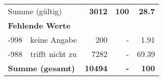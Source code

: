 \begin{longtable}{lXrrr}
     \midrule
     \multicolumn{2}{l}{Summe (gültig)} &
       \textbf{\num{3012}} &
     \textbf{100} &
       \textbf{\num[round-mode=places,round-precision=2]{28,7}} \\
     \multicolumn{5}{l}{\textbf{Fehlende Werte}}\\
       -998 &
       keine Angabe &
         \num{200} &
        - &
         \num[round-mode=places,round-precision=2]{1,91} \\
       -988 &
       trifft nicht zu &
         \num{7282} &
        - &
         \num[round-mode=places,round-precision=2]{69,39} \\
     \midrule
     \multicolumn{2}{l}{\textbf{Summe (gesamt)}} &
          \textbf{\num{10494}} &
        \textbf{-} &
        \textbf{100} \\
     \bottomrule
     \end{longtable}
     
